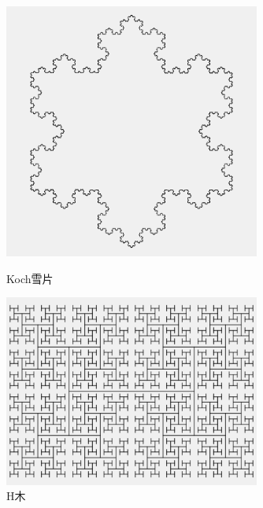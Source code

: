 \documentclass[dvipdfmx]{jsarticle}
\theoremstyle{definition}
\begin{document}
\begin{figure}[H]
    \begin{minipage}{0.49\hsize}
        \centering
        \includegraphics[width=0.75\textwidth]{figure/others/relatives/koch_snowflake.png}
        \caption{Koch雪片}
        \label{pic_koch_snowflake}
    \end{minipage}
    \begin{minipage}{0.49\hsize}
        \centering
        \includegraphics[width=0.75\textwidth]{figure/others/tree/h_tree.png}
        \caption{H木}
    \end{minipage}
\end{figure}
\end{document}
